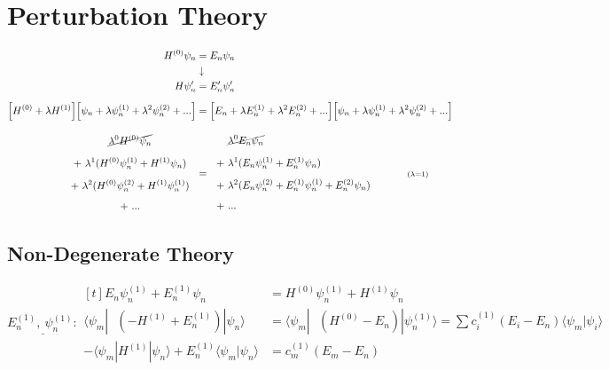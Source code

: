 \documentclass[12pt]{article}
\begin{document}
\section{Perturbation Theory}
\(\begin{aligned}
    H^{(0)} \psi_n & = E_n \psi_n \\
    & \downarrow\\
    H \psi_n' & = E_n' \psi_n'\\[5pt]
    \Big[ H^{(0)} + \lambda H^{(1)} \Big] \Big[ \psi_n + \lambda \psi_n^{(1)} + \lambda^2 \psi_n^{(2)} + ... \Big]
        & = \Big[ E_n + \lambda E_n^{(1)} + \lambda^2 E_n^{(2)} + ... \Big]
        \Big[ \psi_n + \lambda \psi_n^{(1)} + \lambda^2 \psi_n^{(2)} + ... \Big]
        \\[10pt]
    \begin{gathered}
        \cancel{ \lambda^0 H^{(0)} \psi_n }\\[5pt]
        + \ \lambda^1 ( H^{(0)} \psi_n^{(1)} + H^{(1)} \psi_n ) \\[5pt]
        + \ \lambda^2 ( H^{(0)} \psi_n^{(2)} + H^{(1)} \psi_n^{(1)}) \\[5pt]
        + \ ...
    \end{gathered} \ \ & = \ \
        \begin{aligned}
            & \cancel{ \lambda^0 E_n \psi_n }\\[5pt]
            + \ & \lambda^1 ( E_n \psi_n^{(1)} + E_n^{(1)} \psi_n ) \\[5pt]
            + \ & \lambda^2 ( E_n \psi_n^{(2)} + E_n^{(1)} \psi_n^{(1)} + E_n^{(2)} \psi_n ) \\[5pt]
            + \ & ...
        \end{aligned} \hspace{18pt}\hspace{18pt} {\scriptstyle (\lambda = 1)}
\end{aligned}\)


\subsection{Non-Degenerate Theory}

\vspace{10pt} \noindent
\(
    \underline{ E_n^{(1)} , \ \psi_n^{(1)} :} 
    \begin{aligned}[t]
        E_n \psi_n^{(1)} + E_n^{(1)} \psi_n & = H^{(0)} \psi_n^{(1)} + H^{(1)} \psi_n 
            \\[10pt]
        \langle \psi_m | \ \ \ ( - H^{(1)} + E_n^{(1)} ) | \psi_n \rangle 
            & = \langle \psi_m | \ \ \ (H^{(0)} - E_n) | \psi_n^{(1)} \rangle 
            = \sum c_i^{(1)} (E_i - E_n) \langle \psi_m | \psi_i \rangle
            \\[5pt]
        - \langle \psi_m | H^{(1)} | \psi_n \rangle + E_n^{(1)} \langle \psi_m | \psi_n \rangle & = c_m^{(1)} (E_m - E_n)
    \end{aligned}
\)
\end{document}
